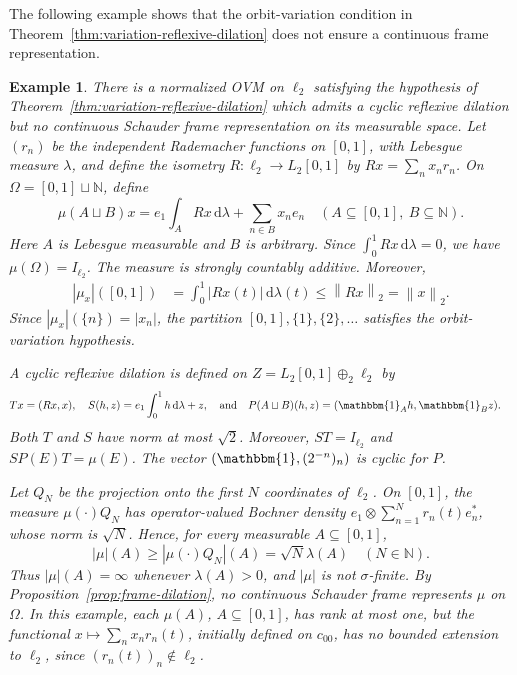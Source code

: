 \documentclass[11pt,leqno]{amsart}
\theoremstyle{compact}
\numberwithin{equation}{section}
\theoremstyle{compactremark}
\newtheorem{example}[theorem]{Example}
\theoremstyle{compact}
\newcommand{\1}{\mathbbm{1}}
\newcommand{\rmd}{\mathrm{d}}
\newcommand{\N}{\mathbb{N}}
\newcommand{\norm}[1]{\left\|#1\right\|}
\newcommand{\abs}[1]{\left|#1\right|}
\begin{document}
The following example shows that the orbit-variation condition in Theorem~\ref{thm:variation-reflexive-dilation} does not ensure a continuous frame representation.

\begin{example}\label{ex:orbit-variation-no-frame}
There is a normalized OVM on $\ell_2$ satisfying the hypothesis of Theorem~\ref{thm:variation-reflexive-dilation} which admits a cyclic reflexive dilation but no continuous Schauder frame representation on its measurable space. Let $(r_n)$ be the independent Rademacher functions on $[0,1]$, with Lebesgue measure $\lambda$, and define the isometry $R\colon\ell_2\to L_2[0,1]$ by $Rx=\sum_nx_nr_n$. On $\Omega=[0,1]\sqcup\N$, define
\[
\mu(A\sqcup B)x=e_1\int_A Rx\,\rmd\lambda+\sum_{n\in B}x_ne_n
\quad(A\subseteq[0,1],\ B\subseteq\N).
\]
Here $A$ is Lebesgue measurable and $B$ is arbitrary. Since $\int_0^1Rx\,\rmd\lambda=0$, we have $\mu(\Omega)=I_{\ell_2}$. The measure is strongly countably additive. Moreover,
\begin{align*}
\abs{\mu_x}([0,1])
&=\int_0^1\abs{Rx(t)}\,\rmd\lambda(t)
  \leq\norm{Rx}_2=\norm{x}_2.
\end{align*}
Since $\abs{\mu_x}(\{n\})=\abs{x_n}$, the partition $[0,1],\{1\},\{2\},\ldots$ satisfies the orbit-variation hypothesis.

A cyclic reflexive dilation is defined on $Z=L_2[0,1]\oplus_2\ell_2$ by
\begin{align*}
Tx&=(Rx,x),\quad S(h,z)=e_1\int_0^1h\,\rmd\lambda+z,
  \quad\text{and}\quad P(A\sqcup B)(h,z)=(\1_Ah,\1_Bz).
\end{align*}
Both $T$ and $S$ have norm at most $\sqrt2$. Moreover, $ST=I_{\ell_2}$ and $SP(E)T=\mu(E)$. The vector $(\1,(2^{-n})_n)$ is cyclic for $P$.

Let $Q_N$ be the projection onto the first $N$ coordinates of $\ell_2$. On $[0,1]$, the measure $\mu(\cdot)Q_N$ has operator-valued Bochner density $e_1\otimes\sum_{n=1}^Nr_n(t)e_n^*$, whose norm is $\sqrt N$. Hence, for every measurable $A\subseteq[0,1]$,
\[
\abs{\mu}(A)\geq\abs{\mu(\cdot)Q_N}(A)
=\sqrt N\lambda(A)\quad(N\in\N).
\]
Thus $\abs{\mu}(A)=\infty$ whenever $\lambda(A)>0$, and $\abs{\mu}$ is not $\sigma$-finite. By Proposition~\ref{prop:frame-dilation}, no continuous Schauder frame represents $\mu$ on $\Omega$. In this example, each $\mu(A)$, $A\subseteq[0,1]$, has rank at most one, but the functional $x\mapsto\sum_nx_nr_n(t)$, initially defined on $c_{00}$, has no bounded extension to $\ell_2$, since $(r_n(t))_n\notin\ell_2$.
\end{example}
\end{document}
